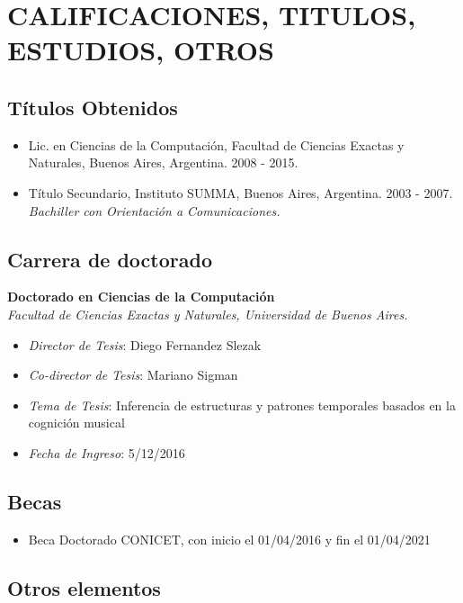\documentclass[a4paper,10pt]{article}
\begin{document}
\section{CALIFICACIONES, TITULOS, ESTUDIOS, OTROS}

\subsection{Títulos Obtenidos}

\begin{itemize}
    \item {Lic. en Ciencias de la Computación, Facultad de Ciencias Exactas y
        Naturales, Buenos Aires, Argentina. 2008 - 2015.}
    \item {Título Secundario, Instituto SUMMA, Buenos Aires, Argentina. 2003
            - 2007. \\
        {\small \itshape Bachiller con Orientación a Comunicaciones.}}
\end{itemize}

\subsection{Carrera de doctorado}

\textbf{Doctorado en Ciencias de la Computación}\\
\indent{}\emph{Facultad de Ciencias Exactas y Naturales, Universidad de Buenos Aires.}
\begin{itemize}
    \item \emph{Director de Tesis}: Diego Fernandez Slezak
    \item \emph{Co-director de Tesis}: Mariano Sigman
    \item \emph{Tema de Tesis}: Inferencia de estructuras y patrones temporales
        basados en la cognición musical
    \item \emph{Fecha de Ingreso}: 5/12/2016
\end{itemize}

\subsection{Becas}

\begin{itemize}
    \item Beca Doctorado CONICET, con inicio el 01/04/2016 y fin el 01/04/2021
\end{itemize}

\subsection{Otros elementos}
\end{document}
